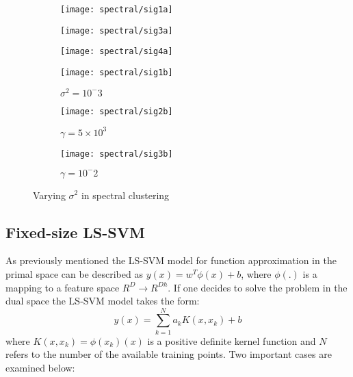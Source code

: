 \documentclass[conference,compsoc]{IEEEtran}
\begin{document}
\begin{figure}[htb]
    \centering %

\begin{subfigure}{0.33\textwidth}
  \texttt{[image: spectral/sig1a]}

  \label{fig:4}
\end{subfigure}\hfil %
\begin{subfigure}{0.33\textwidth}
  \texttt{[image: spectral/sig3a]}

  \label{fig:5}
\end{subfigure}\hfil %
\begin{subfigure}{0.33\textwidth}
 \texttt{[image: spectral/sig4a]}

  \label{fig:6}
\end{subfigure}
\begin{subfigure}{0.33\textwidth}
  \texttt{[image: spectral/sig1b]}
 \caption{$\sigma^2 =10^-3$}
  \label{fig:1}
\end{subfigure}\hfil %
\begin{subfigure}{0.33\textwidth}
   \texttt{[image: spectral/sig2b]}
   \caption{$\gamma =5 \times 10^3$}
  \label{fig:2}
\end{subfigure}\hfil %
\begin{subfigure}{0.33\textwidth}
 \texttt{[image: spectral/sig3b]}
   \caption{$\gamma =10^-2$}
  \label{fig:3}
\end{subfigure}

\caption{Varying $\sigma^2$ in spectral clustering}
\label{fig:spec1}
\end{figure}






\subsection{Fixed-size LS-SVM}

As previously mentioned the LS-SVM model for function approximation in the primal space can be described as $y(x)=w^T\phi(x)+b$, where $\phi(.) $ is a mapping to a feature space $R^D \rightarrow R^{Dh}$. If one decides to solve the problem in the dual space the LS-SVM model takes the form:
\begin{equation}
y(x)=\sum_{k=1}^{N}a_kK(x,x_k)+b
\end{equation}
where $K(x,x_k)=\phi(x_k)(x)$ is a positive definite kernel function and $N$ refers to the number of the available training points. Two important cases are examined below:
\end{document}
